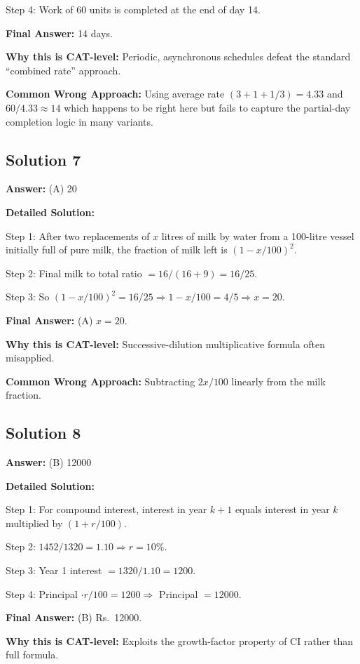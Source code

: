 \documentclass[11pt]{article}
\begin{document}
Step 4: Work of 60 units is completed at the end of day 14.

\textbf{Final Answer:} 14 days.

\textbf{Why this is CAT-level:} Periodic, asynchronous schedules defeat the standard ``combined rate'' approach.

\textbf{Common Wrong Approach:} Using average rate $(3 + 1 + 1/3) = 4.33$ and $60/4.33 \approx 14$ which happens to be right here but fails to capture the partial-day completion logic in many variants.

\subsection*{Solution 7}
\textbf{Answer:} (A) 20

\textbf{Detailed Solution:}

Step 1: After two replacements of $x$ litres of milk by water from a 100-litre vessel initially full of pure milk, the fraction of milk left is $(1 - x/100)^2$.

Step 2: Final milk to total ratio $= 16/(16+9) = 16/25$.

Step 3: So $(1 - x/100)^2 = 16/25 \Rightarrow 1 - x/100 = 4/5 \Rightarrow x = 20$.

\textbf{Final Answer:} (A) $x = 20$.

\textbf{Why this is CAT-level:} Successive-dilution multiplicative formula often misapplied.

\textbf{Common Wrong Approach:} Subtracting $2x/100$ linearly from the milk fraction.

\subsection*{Solution 8}
\textbf{Answer:} (B) 12000

\textbf{Detailed Solution:}

Step 1: For compound interest, interest in year $k+1$ equals interest in year $k$ multiplied by $(1 + r/100)$.

Step 2: $1452/1320 = 1.10 \Rightarrow r = 10\%$.

Step 3: Year 1 interest $= 1320/1.10 = 1200$.

Step 4: Principal $\cdot r/100 = 1200 \Rightarrow$ Principal $= 12000$.

\textbf{Final Answer:} (B) Rs.\ 12000.

\textbf{Why this is CAT-level:} Exploits the growth-factor property of CI rather than full formula.
\end{document}
